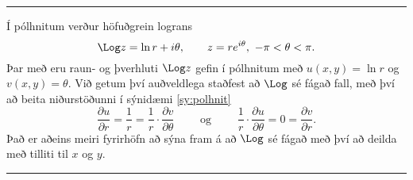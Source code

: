 \bigskip\hrule\bigskip

\begin{sy}
Í pólhnitum verður höfuðgrein lograns
$$
\Log z =\ln r+i\theta,  \qquad z=re^{i\theta}, \ -\pi<\theta<\pi.
$$
Þar með eru raun- og þverhluti $\Log z$ gefin í pólhnitum með
$u(x,y)=\ln r$ og $v(x,y)=\theta$. Við getum því auðveldlega
staðfest að $\Log$ sé fágað fall, með því að beita niðurstöðunni 
í sýnidæmi \ref{sy:polhnit}
$$
\dfrac{\partial u}{\partial r}=\dfrac 1r=\dfrac 1r\cdot \dfrac 
{\partial v}{\partial \theta}\qquad \text{ og } \qquad
\dfrac 1r\cdot \dfrac{\partial u}{\partial \theta}=0=\dfrac {\partial
v}{\partial r}.
$$
Það er aðeins meiri fyrirhöfn að sýna fram
á að $\Log$ sé fágað með því að deilda með tilliti til $x$ og $y$.
\end{sy}

\bigskip\hrule\bigskip

